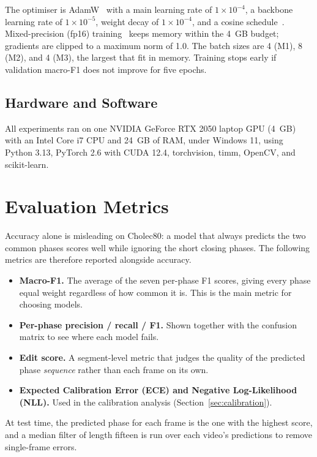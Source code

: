 The optimiser is AdamW~\cite{loshchilov2019decoupled} with a main learning rate of $1\times10^{-4}$, a backbone learning rate of $1\times10^{-5}$, weight decay of $1\times10^{-4}$, and a cosine schedule~\cite{loshchilov2017sgdr}. Mixed-precision (fp16) training~\cite{micikevicius2018mixed} keeps memory within the 4~GB budget; gradients are clipped to a maximum norm of 1.0. The batch sizes are 4 (M1), 8 (M2), and 4 (M3), the largest that fit in memory. Training stops early if validation macro-F1 does not improve for five epochs.

\subsection{Hardware and Software}

All experiments ran on one NVIDIA GeForce RTX 2050 laptop GPU (4~GB) with an Intel Core i7 CPU and 24~GB of RAM, under Windows 11, using Python 3.13, PyTorch 2.6 with CUDA 12.4, torchvision, timm, OpenCV, and scikit-learn.

\section{Evaluation Metrics}

Accuracy alone is misleading on Cholec80: a model that always predicts the two common phases scores well while ignoring the short closing phases. The following metrics are therefore reported alongside accuracy.

\begin{itemize}
    \item \textbf{Macro-F1.} The average of the seven per-phase F1 scores, giving every phase equal weight regardless of how common it is. This is the main metric for choosing models.
    \item \textbf{Per-phase precision / recall / F1.} Shown together with the confusion matrix to see where each model fails.
    \item \textbf{Edit score.} A segment-level metric that judges the quality of the predicted phase \emph{sequence} rather than each frame on its own.
    \item \textbf{Expected Calibration Error (ECE) and Negative Log-Likelihood (NLL).} Used in the calibration analysis (Section~\ref{sec:calibration}).
\end{itemize}

At test time, the predicted phase for each frame is the one with the highest score, and a median filter of length fifteen is run over each video's predictions to remove single-frame errors.

